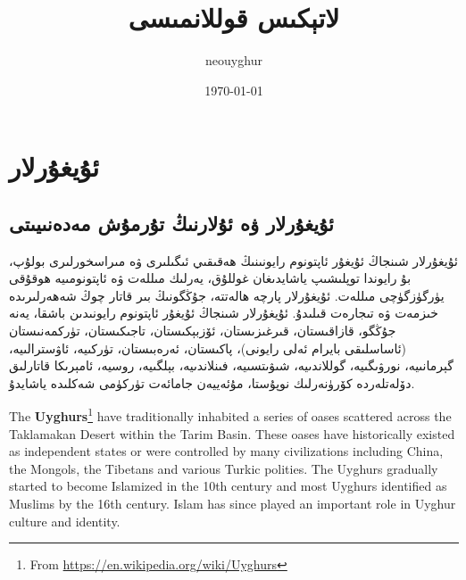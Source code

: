 \documentclass[a4paper]{book}
\title{لاتېكىس قوللانمىسى}
\author{neouyghur}
\date{\today}
\begin{document}
\maketitle

\tableofcontents

\listoffigures

\listoftables


\chapter{ئۇيغۇرلار}

\section{ئۇيغۇرلار ۋە ئۇلارنىڭ تۇرمۇش مەدەنىيىتى}

ئۇيغۇرلار شىنجاڭ ئۇيغۇر ئاپتونوم رايونىنىڭ ھەقىقىي ئىگىلىرى ۋە مىراسخورلىرى بولۇپ، بۇ رايوندا توپلىشىپ ياشايدىغان غوللۇق، يەرلىك مىللەت ۋە ئاپتونومىيە ھوقۇقى يۈرگۈزگۈچى مىللەت. ئۇيغۇرلار پارچە ھالەتتە، جۇڭگونىڭ بىر قاتار چوڭ شەھەرلىرىدە خىزمەت ۋە تىجارەت قىلىدۇ. ئۇيغۇرلار شىنجاڭ ئۇيغۇر ئاپتونوم رايونىدىن باشقا، يەنە جۇڭگو، قازاقىستان، قىرغىزىستان، ئۆزبېكىستان، تاجىكىستان، تۈركمەنىستان (ئاساسلىقى بايرام ئەلى رايونى)، پاكىستان، ئەرەبىستان، تۈركىيە، ئاۋسترالىيە، گېرمانىيە، نورۋىگىيە، گوللاندىيە، شىۋىتسىيە، فىنلاندىيە، بېلگىيە، روسيە، ئامېرىكا قاتارلىق دۆلەتلەردە كۆرۈنەرلىك نوپۇستا، مۇئەييەن جامائەت تۈركۈمى شەكلىدە ياشايدۇ.

\begin{english}
The \textbf{Uyghurs}\footnote{%
	From \url{https://en.wikipedia.org/wiki/Uyghurs}}  have traditionally inhabited a series of oases scattered across the Taklamakan Desert within the Tarim Basin. These oases have historically existed as independent states or were controlled by many civilizations including China, the Mongols, the Tibetans and various Turkic polities. The Uyghurs gradually started to become Islamized in the 10th century and most Uyghurs identified as Muslims by the 16th century. Islam has since played an important role in Uyghur culture and identity. 
\end{english}
\end{document}
